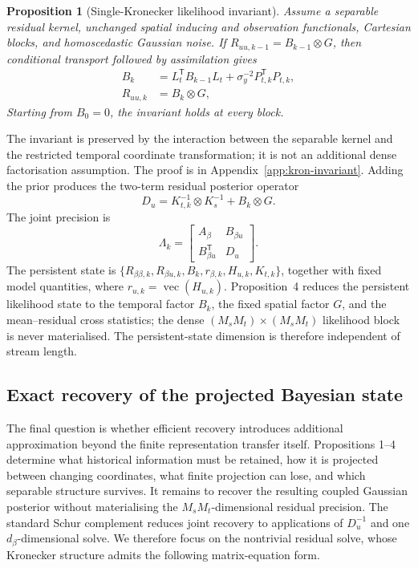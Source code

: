 \documentclass[twoside]{article}
\newcommand{\trans}{\mathsf T}
\newtheorem{proposition}{Proposition}
\begin{document}
\begin{proposition}[Single-Kronecker likelihood invariant]
\label{prop:kron-invariant}
Assume a separable residual kernel, unchanged spatial inducing and observation functionals, Cartesian blocks, and homoscedastic Gaussian noise. If $R_{uu,k-1}=B_{k-1}\otimes G$, then conditional transport followed by assimilation gives
\begin{align}
 B_k&=L_t^{\trans}B_{k-1}L_t+\sigma_y^{-2}P_{t,k}^{\trans}P_{t,k}, \nonumber\\
 R_{uu,k}&=B_k\otimes G,
 \label{eq:kron-precision}
\end{align}
Starting from $B_0=0$, the invariant holds at every block.
\end{proposition}
The invariant is preserved by the interaction between the separable kernel and the restricted temporal coordinate transformation; it is not an additional dense factorisation assumption. The proof is in Appendix~\ref{app:kron-invariant}. Adding the prior produces the two-term residual posterior operator
\begin{equation}
D_u=K_{t,k}^{-1}\otimes K_s^{-1}+B_k\otimes G.
\label{eq:du-operator}
\end{equation}
The joint precision is
\begin{equation}
 \Lambda_k=
 \begin{bmatrix}A_\beta&B_{\beta u}\\B_{\beta u}^{\trans}&D_u\end{bmatrix}.
 \label{eq:joint-precision}
\end{equation}
The persistent state is $\{R_{\beta\beta,k},R_{\beta u,k},B_k,r_{\beta,k},H_{u,k},K_{t,k}\}$, together with fixed model quantities, where $r_{u,k}=\operatorname{vec}(H_{u,k})$. Proposition~4 reduces the persistent likelihood state to the temporal factor $B_k$, the fixed spatial factor $G$, and the mean--residual cross statistics; the dense $(M_sM_t)\times(M_sM_t)$ likelihood block is never materialised. The persistent-state dimension is therefore independent of stream length.

\subsection{Exact recovery of the projected Bayesian state}

The final question is whether efficient recovery introduces additional approximation beyond the finite representation transfer itself. Propositions 1--4 determine what historical information must be retained, how it is projected between changing coordinates, what finite projection can lose, and which separable structure survives. It remains to recover the resulting coupled Gaussian posterior without materialising the $M_sM_t$-dimensional residual precision. The standard Schur complement reduces joint recovery to applications of $D_u^{-1}$ and one $d_\beta$-dimensional solve. We therefore focus on the nontrivial residual solve, whose Kronecker structure admits the following matrix-equation form.
\end{document}
